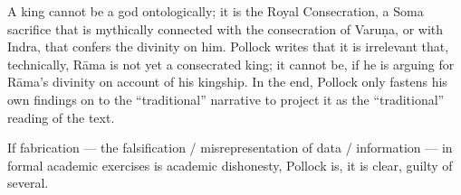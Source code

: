 A king cannot be a god ontologically; it is the Royal Consecration, a Soma sacrifice that is mythically connected with the consecration of Varuṇa, or with Indra, that confers the divinity on him. Pollock writes that it is irrelevant that, technically, Rāma is not yet a consecrated king; it cannot be, if he is arguing for Rāma’s divinity on account of his kingship. In the end, Pollock only fastens his own findings on to the “traditional” narrative to project it as the “traditional” reading of the text. 

If fabrication --- the falsification / misrepresentation of data / information ---  in formal academic exercises is academic dishonesty, Pollock is, it is clear, guilty of several.
